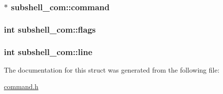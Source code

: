 \subsubsection[{\texorpdfstring{command}{command}}]{$\ast$ subshell\+\_\+com\+::command}\hypertarget{structsubshell__com_aedbe947202b66c67bc19e14509b6690b}{}\label{structsubshell__com_aedbe947202b66c67bc19e14509b6690b}
\subsubsection[{\texorpdfstring{flags}{flags}}]{\setlength{\rightskip}{0pt plus 5cm}int subshell\+\_\+com\+::flags}\hypertarget{structsubshell__com_a0edd264e3360fbdefe14faf33c66b54f}{}\label{structsubshell__com_a0edd264e3360fbdefe14faf33c66b54f}
\subsubsection[{\texorpdfstring{line}{line}}]{\setlength{\rightskip}{0pt plus 5cm}int subshell\+\_\+com\+::line}\hypertarget{structsubshell__com_a3c67c5a0510a7e48b1a50b80ae58d7dc}{}\label{structsubshell__com_a3c67c5a0510a7e48b1a50b80ae58d7dc}


The documentation for this struct was generated from the following file\+:\begin{DoxyCompactItemize}
\item 
\hyperlink{command_8h}{command.\+h}\end{DoxyCompactItemize}
